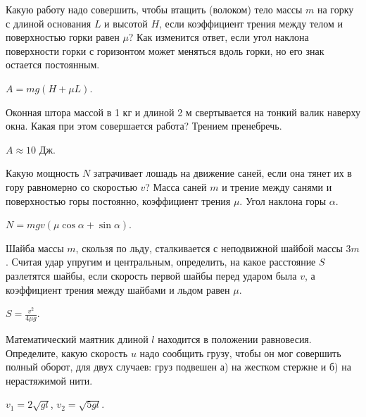 \simpleProblems

\begin{ex} %
Какую работу надо совершить, чтобы втащить (волоком) тело массы $m$ на горку с длиной основания $L$ и высотой $H$, если коэффициент трения между телом и поверхностью горки равен $\mu$? Как изменится ответ, если угол наклона поверхности горки с горизонтом может меняться вдоль горки, но его знак остается постоянным.
\begin{ans}
$A=mg(H+\mu L)$.
\end{ans}
\end{ex}

\begin{ex}
Оконная штора массой в 1 кг и длиной 2 м свертывается на тонкий валик наверху окна. Какая при этом совершается работа? Трением пренебречь.
\begin{ans}
$A \approx 10$ Дж.
\end{ans}
\end{ex}

\begin{ex} %
Какую мощность $N$ затрачивает лошадь на движение саней, если она тянет их в гору равномерно со скоростью $v$? Масса саней $m$ и трение между санями и поверхностью горы постоянно, коэффициент трения $\mu$. Угол наклона горы $\alpha$.
\begin{ans}
$N = mgv(\mu \cos \alpha +\sin \alpha)$.
\end{ans}
\end{ex}

\begin{ex} %
Шайба массы $m$, скользя по льду, сталкивается с неподвижной шайбой массы $3m$. Считая удар упругим и центральным, определить, на какое расстояние $S$ разлетятся шайбы, если скорость первой шайбы перед ударом была $v$, а коэффициент трения между шайбами и льдом равен $\mu$.
\begin{ans}
$S = \frac{v^2}{4 \mu g}$.
\end{ans}
\end{ex}

\begin{ex} %
Математический маятник длиной $l$ находится в положении равновесия. Определите, какую скорость $u$ надо сообщить грузу, чтобы он мог совершить полный оборот, для двух случаев: груз подвешен а) на жестком стержне и б) на нерастяжимой нити.
\begin{ans}
$v_1 = 2\sqrt{gl}$, $v_2 = \sqrt{5gl}$.
\end{ans}
\end{ex}

